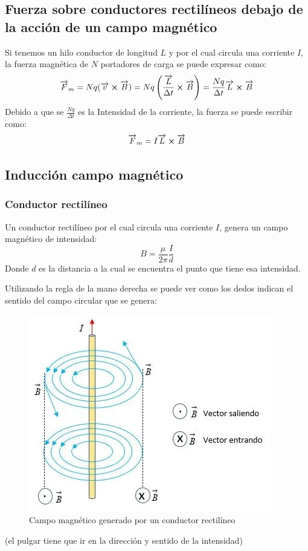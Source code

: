 \documentclass[arial,a4paper,print]{article}
\begin{document}
\subsection{Fuerza sobre conductores rectilíneos debajo de la acción de un campo magnético}
Si tenemos un hilo conductor de longitud $L$ y por el cual circula una corriente $I$, la fuerza magnética de $N$ portadores de carga se puede expresar como:
\begin{equation*}
	\overrightarrow{F}_{m} = Nq(\overrightarrow{v}\cross\overrightarrow{B}) = Nq\left(\frac{\overrightarrow{L}}{\Delta t}\cross\overrightarrow{B}\right) = \frac{Nq}{\Delta t}\overrightarrow{L}\cross\overrightarrow{B}
\end{equation*}
Debido a que se $\frac{Nq}{\Delta t}$ es la Intensidad de la corriente, la fuerza se puede escribir como:
\begin{equation*}
	\overrightarrow{F}_{m} = I\overrightarrow{L}\cross\overrightarrow{B}
\end{equation*}

\subsection{Inducción campo magnético}
\subsubsection{Conductor rectilíneo}
Un conductor rectilíneo por el cual circula una corriente $I$, genera un campo magnético de intensidad:
\begin{equation*}
	B=\frac{\mu}{2\pi}\frac{I}{d}
\end{equation*}
Donde $d$ es la distancia a la cual se encuentra el punto que tiene esa intensidad. 

Utilizando la regla de la mano derecha se puede ver como los dedos indican el sentido del campo circular que se genera:
\begin{figure}[h]
	\centering
	\includegraphics[width=0.5\linewidth]{magnetico_linea}
	\caption{Campo magnético generado por un conductor rectilíneo}
	\label{fig:magneticolinea}
\end{figure}
(el pulgar tiene que ir en la dirección y sentido de la intensidad)
\end{document}
